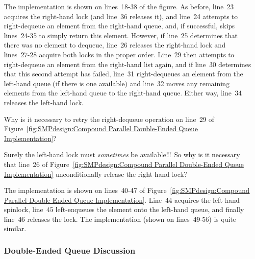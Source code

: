 The  implementation is shown on lines~18-38
of the figure.
As before, line~23 acquires the right-hand lock (and line~36
releases it), and line~24 attempts to right-dequeue an element
from the right-hand queue, and, if successful, skips lines~24-35
to simply return this element.
However, if line~25 determines that there was no element to dequeue,
line~26 releases the right-hand lock and lines~27-28 acquire both
locks in the proper order.
Line~29 then attempts to right-dequeue an element from the right-hand
list again, and if line~30 determines that this second attempt has
failed, line~31 right-dequeues an element from the left-hand queue
(if there is one available) and line~32 moves any remaining elements
from the left-hand queue to the right-hand queue.
Either way, line~34 releases the left-hand lock.

\QuickQuiz{}
	Why is it necessary to retry the right-dequeue operation
	on line~29 of
	Figure~\ref{fig:SMPdesign:Compound Parallel Double-Ended Queue Implementation}?
 \QuickQuizEnd

\QuickQuiz{}
	Surely the left-hand lock must \emph{sometimes} be available!!!
	So why is it necessary that line~26 of
	Figure~\ref{fig:SMPdesign:Compound Parallel Double-Ended Queue Implementation}
	unconditionally release the right-hand lock?
 \QuickQuizEnd

The  implementation is shown on lines~40-47 of
Figure~\ref{fig:SMPdesign:Compound Parallel Double-Ended Queue Implementation}.
Line~44 acquires the left-hand spinlock, line~45 left-enqueues the
element onto the left-hand queue, and finally line~46 releases
the lock.
The  implementation (shown on lines~49-56)
is quite similar.

\subsubsection{Double-Ended Queue Discussion}
\label{sec:SMPdesign:Double-Ended Queue Discussion}

